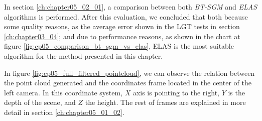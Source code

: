 In section \ref{ch:chapter05_02_01}, a comparison between both \emph{BT-SGM} and \emph{ELAS} algorithms is performed. After this evaluation, we concluded that both because some quality reasons, as the average error shown in the \ac{LGT} tests in section \ref{ch:chapter03_04}; and due to performance reasons, as shown in the chart at figure \ref{fig:cp05_comparison_bt_sgm_vs_elas}, ELAS is the most suitable algorithm for the method presented in this chapter.

In figure \ref{fig:cp05_full_filtered_pointcloud}, we can observe the relation between the point cloud generated and the coordinates frame located in the center of the left camera. In this coordinate system, $X$ axis is pointing to the right, $Y$ is the depth of the scene, and $Z$ the height. The rest of frames are explained in more detail in section \ref{ch:chapter05_01_02}.

